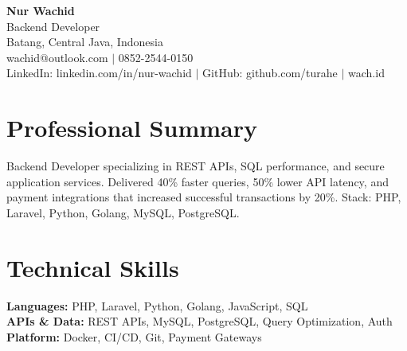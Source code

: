 \begin{center}
  {\LARGE\bfseries Nur Wachid}\\[3pt]
  Backend Developer\\[2pt]
  Batang, Central Java, Indonesia\\[2pt]
  wachid@outlook.com $|$ 0852-2544-0150\\[1pt]
  LinkedIn: linkedin.com/in/nur-wachid $|$ GitHub: github.com/turahe $|$ wach.id
\end{center}
\section*{Professional Summary}
Backend Developer specializing in REST APIs, SQL performance, and secure application services. Delivered 40\% faster queries, 50\% lower API latency, and payment integrations that increased successful transactions by 20\%. Stack: PHP, Laravel, Python, Golang, MySQL, PostgreSQL.
\section*{Technical Skills}
\textbf{Languages:} PHP, Laravel, Python, Golang, JavaScript, SQL\\[1pt]
\textbf{APIs \& Data:} REST APIs, MySQL, PostgreSQL, Query Optimization, Auth\\[1pt]
\textbf{Platform:} Docker, CI/CD, Git, Payment Gateways
